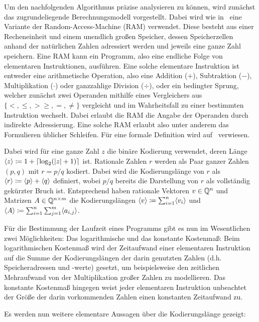 Um den nachfolgenden Algorithmus präzise analysieren zu können, wird zunächst das zugrundeliegende Berechnungsmodell vorgestellt.
Dabei wird wie in~\cite{Gritzmann2013} eine Variante der Random-Access-Machine (RAM) verwendet.
Diese besteht aus einer Recheneinheit und einem unendlich großen Speicher, dessen Speicherzellen anhand der natürlichen Zahlen adressiert werden und jeweils eine ganze Zahl speichern.
Eine RAM kann ein Programm, also eine endliche Folge von elementaren Instruktionen, ausführen.
Eine solche elementare Instruktion ist entweder eine arithmetische Operation, also eine Addition ($+$), Subtraktion ($-$), Multiplikation ($\cdot$) oder ganzzahlige Division ($\div$), oder ein bedingter Sprung, welcher zunächst zwei Operanden mithilfe eines Vergleichers aus $\{ <, \leq, > \geq, =, \neq \}$ vergleicht und im Wahrheitsfall zu einer bestimmten Instruktion wechselt.
Dabei erlaubt die RAM die Angabe der Operanden durch indirekte Adressierung.
Eine solche RAM erlaubt also unter anderem das Formulieren üblicher Schleifen.
Für eine formale Definition wird auf~\cite{Gritzmann2013} verwiesen.

Dabei wird für eine ganze Zahl $z$ die binäre Kodierung verwendet, deren Länge $\langle z\rangle \coloneq 1 + \lceil \log_2(\lvert z\rvert+1) \rceil$ ist.
Rationale Zahlen $r$ werden als Paar ganzer Zahlen $(p,q)$ mit $r = p/q$ kodiert.
Dabei wird die Kodierungslänge von $r$ als $\langle r\rangle\coloneq \langle p\rangle + \langle q\rangle$ definiert, wobei $p/q$ bereits die Darstellung von $r$ als vollständig gekürzter Bruch ist.
Entsprechend haben rationale Vektoren $v\in\mathbb{Q}^n$ und Matrizen $A\in\mathbb{Q}^{n\times m}$ die Kodierungslängen $\langle v\rangle \coloneq \sum_{i=1}^n \langle v_i\rangle$ und $\langle A\rangle\coloneq \sum_{i=1}^n\sum_{j=1}^m \langle a_{i,j}\rangle$.

Für die Bestimmung der Laufzeit eines Programms gibt es nun im Wesentlichen zwei Möglichkeiten:
Das logarithmische und das konstante Kostenmaß:
Beim logarithmischen Kostenmaß wird der Zeitaufwand einer elementaren Instruktion auf die Summe der Kodierungslängen der darin genutzten Zahlen (d.h. Speicheradressen und -werte) gesetzt, um beispielsweise den zeitlichen Mehraufwand von der Multiplikation großer Zahlen zu modellieren.
Das konstante Kostenmaß hingegen weist jeder elementaren Instruktion unbeachtet der Größe der darin vorkommenden Zahlen einen konstanten Zeitaufwand zu.

Es werden nun weitere elementare Aussagen über die Kodierungslänge gezeigt:

